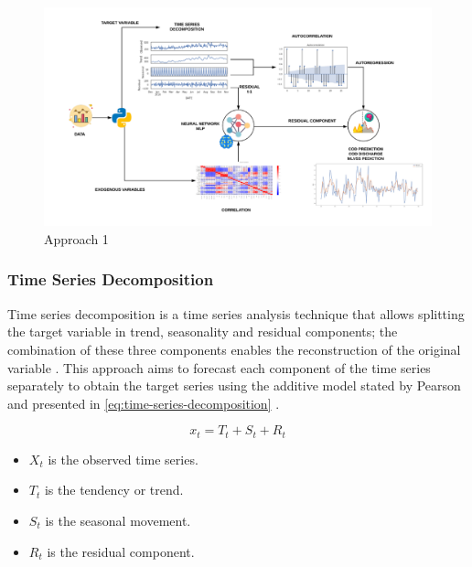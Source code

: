 \begin{figure}[h]
\centering
\includegraphics[width=\linewidth]{figures/Ch4/Approach1.pdf}
\caption{Approach 1}
\label{f:Approach 1}
\end{figure}

\subsubsection{Time Series Decomposition}
\label{ss:time-series-decomposition}

Time series decomposition is a time series analysis technique that allows splitting the target variable in trend, seasonality and residual components; the combination of these three components enables the reconstruction of the original variable \cite{Cryer2008}. This approach aims to forecast each component of the time series separately to obtain the target series using the additive model stated by Pearson and presented in \autoref{eq:time-series-decomposition}
\cite{dagum2010time}.

\begin{equation}\label{eq:time-series-decomposition}
    x_t = T_t + S_t + R_t
\end{equation}

\begin{itemize}
    \item \begin{math}X_t\end{math} is the observed time series.
    \item \begin{math}T_t\end{math} is the tendency or trend.
    \item \begin{math}S_t\end{math} is the seasonal movement.
    \item \begin{math}R_t\end{math} is the residual component.
\end{itemize}

